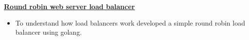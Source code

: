 \textbf{\href{https://github.com/bikz007/rr-loadbalancer-golang}{Round robin web server load balancer}} \par
\begin{itemize}
	\item To understand how load balancers work developed a simple round robin load balancer using golang.
\end{itemize}\vspace{0.1cm}\par